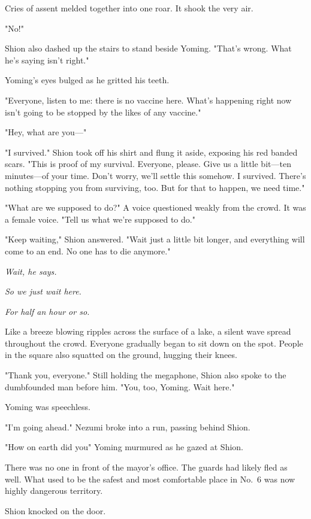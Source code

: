 Cries of assent melded together into one roar. It shook the very air.

"No!"

Shion also dashed up the stairs to stand beside Yoming. "That's wrong.
What he's saying isn't right."

Yoming's eyes bulged as he gritted his teeth.

"Everyone, listen to me: there is no vaccine here. What's happening
right now isn't going to be stopped by the likes of any vaccine."

"Hey, what are you---"

"I survived." Shion took off his shirt and flung it aside, exposing his
red banded scars. "This is proof of my survival. Everyone, please. Give
us a little bit---ten minutes---of your time. Don't worry, we'll settle this
somehow. I survived. There's nothing stopping you from surviving, too.
But for that to happen, we need time."

"What are we supposed to do?" A voice questioned weakly from the crowd.
It was a female voice. "Tell us what we're supposed to do."

"Keep waiting," Shion answered. "Wait just a little bit longer, and
everything will come to an end. No one has to die anymore."

\emph{Wait, he says.}

\emph{So we just wait here.}

\emph{For half an hour or so.}

Like a breeze blowing ripples across the surface of a lake, a silent
wave spread throughout the crowd. Everyone gradually began to sit down
on the spot. People in the square also squatted on the ground, hugging
their knees.

"Thank you, everyone." Still holding the megaphone, Shion also spoke to
the dumbfounded man before him. "You, too, Yoming. Wait here."

Yoming was speechless.

"I'm going ahead." Nezumi broke into a run, passing behind Shion.

"How on earth did you\el " Yoming murmured as he gazed at Shion.

\mybreak

There was no one in front of the mayor's office. The guards had likely
fled as well. What used to be the safest and most comfortable place in
No.~6 was now highly dangerous territory.

Shion knocked on the door.

